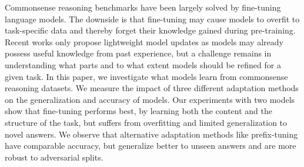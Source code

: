 Commonsense reasoning benchmarks have been largely solved by fine-tuning language models. The downside is that fine-tuning may cause models to overfit to task-specific data and thereby forget their knowledge gained during pre-training. Recent works only propose lightweight model updates as models may already possess useful knowledge from past experience, but a challenge remains in understanding what parts and to what extent models should be refined for a given task. In this paper, we investigate what models learn from commonsense reasoning datasets. We measure the impact of three different adaptation methods on the generalization and accuracy of models. Our experiments with two models show that fine-tuning performs best, by learning both the content and the structure of the task, but suffers from overfitting and limited generalization to novel answers. We observe that alternative adaptation methods like prefix-tuning have comparable accuracy, but generalize better to unseen answers and are more robust to adversarial splits.
